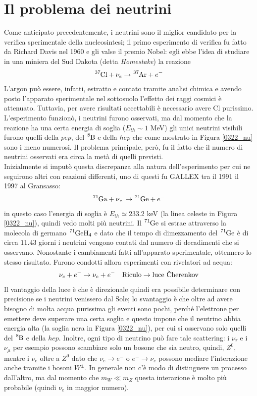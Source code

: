 \section{Il problema dei neutrini}\label{0322-sec-nu}
Come anticipato precedentemente, i neutrini sono il miglior candidato per la verifica sperimentale della nucleosintesi; il primo esperimento di verifica fu fatto da Richard Davis nel 1960 e gli valse il premio Nobel: egli ebbe l'idea di studiare in una miniera del Sud Dakota (detta \textit{Homestake}) la reazione
$$\ce{^{37}Cl} + \nu_e \to \ce{^{37}Ar} + e^-$$
L'argon può essere, infatti, estratto e contato tramite analisi chimica e avendo posto l'apparato sperimentale nel sottosuolo l'effetto dei raggi cosmici è attenuato. Tuttavia, per avere risultati accettabili è necessario avere Cl purissimo. L'esperimento funzionò, i neutrini furono osservati, ma dal momento che la reazione ha una certa energia di soglia ($E_{th}\sim 1$ MeV) gli unici neutrini visibili furono quelli della $pep$, del $\ce{^8B}$ e della $hep$ che come mostrato in Figura \ref{0322_nu} sono i meno numerosi. Il problema principale, però, fu il fatto che il numero di neutrini osservati era circa la metà di quelli previsti.\\
Inizialmente si imputò questa discrepanza alla natura dell'esperimento per cui ne seguirono altri con reazioni differenti, uno di questi fu GALLEX tra il 1991  il 1997 al Gransasso:
$$\ce{^{71}Ga + \nu_e \to \ce{^{71}Ge}} +e^-$$
in questo caso l'energia di soglia è $E_{th}\simeq 233.2$ keV (la linea celeste in Figura \ref{0322_nu}), quindi vedo molti più neutrini. Il $\ce{^{71}Ge}$ si estrae attraverso la molecola di germano $\ce{^{71}GeH_4}$ e dato che il tempo di dimezzamento del $\ce{^{71}Ge}$ è di circa $11.43$ giorni i neutrini vengono contati dal numero di decadimenti che si osservano. Nonostante i cambiamenti fatti all'apparato sperimentale, ottennero lo stesso risultato. Furono condotti allora esperimenti con rivelatori \cherenkov{} ad acqua:
$$\nu_e + e^- \to \nu_e + e^- \quad \text{Riculo} \to \text{luce \cherenkov}$$
Il vantaggio della luce \cherenkov{} è che è direzionale quindi era possibile determinare con precisione se i neutrini venissero dal Sole; lo svantaggio è che oltre ad avere bisogno di molta acqua purissima gli eventi sono pochi, perché l'elettrone per emettere deve superare una certa soglia e questo impone che il neutrino abbia energia alta (la soglia nera in Figura \ref{0322_nu}), per cui si osservano solo quelli del $\ce{^8B}$ e della $hep$. Inoltre, ogni tipo di neutrino può fare tale scattering: i $\nu_\tau$ e i $\nu_\mu$ per esempio possono scambiare solo un bosone che sia neutro, quindi, $Z^0$, mentre i $\nu_e$ oltre a $Z^0$ dato che $\nu_e\to e^-$ o $e^-\to \nu_e$ possono mediare l'interazione anche tramite i bosoni $W^\pm$. In generale non c'è modo di distinguere un processo dall'altro, ma dal momento che $m_W\ll m_Z$ questa interazione è molto più probabile (quindi $\nu_e$ in maggior numero).
